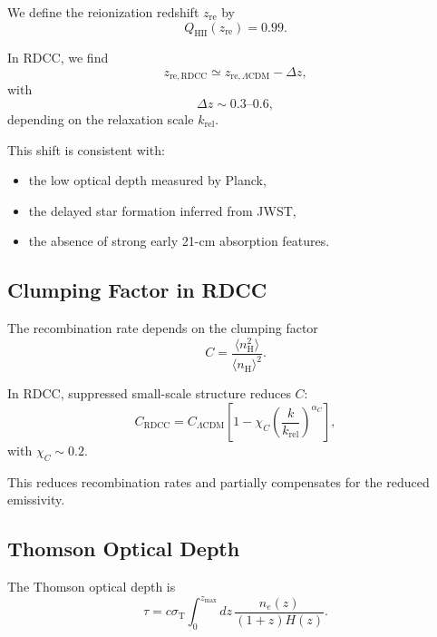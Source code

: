 \documentclass[11pt,a4paper]{article}
\begin{document}
We define the reionization redshift $z_{\mathrm{re}}$ by
\begin{equation}
Q_{\mathrm{HII}}(z_{\mathrm{re}}) = 0.99.
\end{equation}

In RDCC, we find
\begin{equation}
z_{\mathrm{re,RDCC}}
\simeq
z_{\mathrm{re},\Lambda\mathrm{CDM}}
-
\Delta z,
\end{equation}
with
\begin{equation}
\Delta z \sim 0.3\text{--}0.6,
\end{equation}
depending on the relaxation scale $k_{\mathrm{rel}}$.

This shift is consistent with:
\begin{itemize}
\item the low optical depth measured by Planck,
\item the delayed star formation inferred from JWST,
\item the absence of strong early 21-cm absorption features.
\end{itemize}

\subsection{Clumping Factor in RDCC}

The recombination rate depends on the clumping factor
\begin{equation}
C
=
\frac{\langle n_{\mathrm{H}}^{2} \rangle}{\langle n_{\mathrm{H}} \rangle^{2}}.
\end{equation}

In RDCC, suppressed small-scale structure reduces $C$:
\begin{equation}
C_{\mathrm{RDCC}}
=
C_{\Lambda\mathrm{CDM}}
\left[
1
-
\chi_{C}
\left(
\frac{k}{k_{\mathrm{rel}}}
\right)^{\alpha_{C}}
\right],
\end{equation}
with $\chi_{C} \sim 0.2$.

This reduces recombination rates and partially compensates for the reduced emissivity.

\subsection{Thomson Optical Depth}

The Thomson optical depth is
\begin{equation}
\tau
=
c \sigma_{\mathrm{T}}
\int_{0}^{z_{\mathrm{max}}}
dz\,
\frac{n_{e}(z)}{(1+z)H(z)}.
\end{equation}
\end{document}
